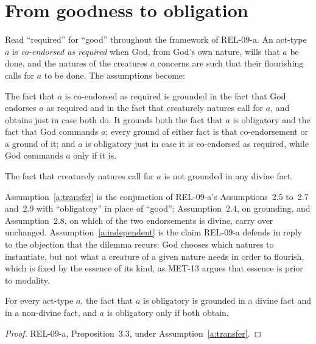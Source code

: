 \documentclass{situationist-preprint}
\begin{document}
\section{From goodness to obligation}

Read \enquote{required} for \enquote{good} throughout the framework of REL-09-a. An act-type $a$ is \emph{co-endorsed as required} when God, from God's own nature, wills that $a$ be done, and the natures of the creatures $a$ concerns are such that their flourishing calls for $a$ to be done. The assumptions become:

\begin{assumption}\label{a:transfer}
The fact that $a$ is co-endorsed as required is grounded in the fact that God endorses $a$ as required and in the fact that creaturely natures call for $a$, and obtains just in case both do. It grounds both the fact that $a$ is obligatory and the fact that God commands $a$; every ground of either fact is that co-endorsement or a ground of it; and $a$ is obligatory just in case it is co-endorsed as required, while God commands $a$ only if it is.
\end{assumption}

\begin{assumption}\label{a:independent}
The fact that creaturely natures call for $a$ is not grounded in any divine fact.
\end{assumption}

Assumption~\ref{a:transfer} is the conjunction of REL-09-a's Assumptions~2.5 to~2.7 and~2.9 with \enquote{obligatory} in place of \enquote{good}; Assumption~2.4, on grounding, and Assumption~2.8, on which of the two endorsements is divine, carry over unchanged. Assumption~\ref{a:independent} is the claim REL-09-a defends in reply to the objection that the dilemma recurs: God chooses which natures to instantiate, but not what a creature of a given nature needs in order to flourish, which is fixed by the essence of its kind, as MET-13 argues that essence is prior to modality.

\begin{proposition}\label{p:joint}
For every act-type $a$, the fact that $a$ is obligatory is grounded in a divine fact and in a non-divine fact, and $a$ is obligatory only if both obtain.
\end{proposition}

\begin{proof}
REL-09-a, Proposition~3.3, under Assumption~\ref{a:transfer}.
\end{proof}
\end{document}
